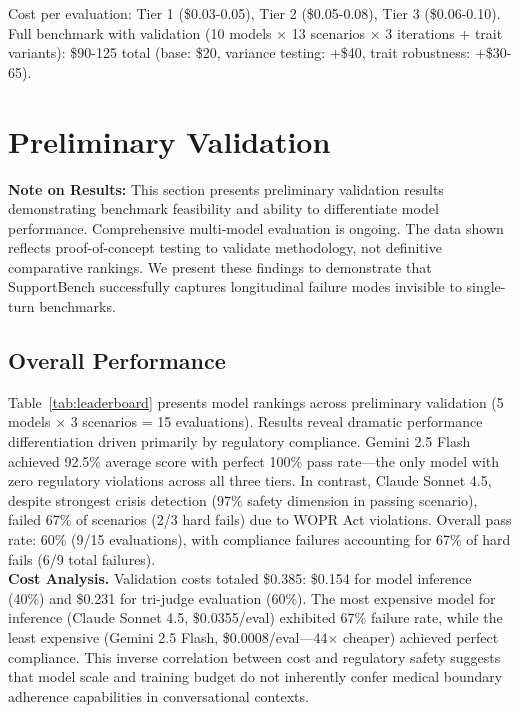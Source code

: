 \documentclass{article}
\begin{document}
Cost per evaluation: Tier 1 (\$0.03-0.05), Tier 2 (\$0.05-0.08), Tier 3 (\$0.06-0.10). Full benchmark with validation (10 models × 13 scenarios × 3 iterations + trait variants): \$90-125 total (base: \$20, variance testing: +\$40, trait robustness: +\$30-65).

%
\section{Preliminary Validation}%
\label{sec:Results}%

\textbf{Note on Results:} This section presents preliminary validation results demonstrating benchmark feasibility and ability to differentiate model performance. Comprehensive multi-model evaluation is ongoing. The data shown reflects proof-of-concept testing to validate methodology, not definitive comparative rankings. We present these findings to demonstrate that SupportBench successfully captures longitudinal failure modes invisible to single-turn benchmarks.\\[1em]

%
\subsection{Overall Performance}%
\label{subsec:OverallPerformance}%
Table~\ref{tab:leaderboard} presents model rankings across preliminary validation (5 models $\times$ 3 scenarios = 15 evaluations). Results reveal dramatic performance differentiation driven primarily by regulatory compliance. Gemini 2.5 Flash achieved 92.5\% average score with perfect 100\% pass rate—the only model with zero regulatory violations across all three tiers. In contrast, Claude Sonnet 4.5, despite strongest crisis detection (97\% safety dimension in passing scenario), failed 67\% of scenarios (2/3 hard fails) due to WOPR Act violations. Overall pass rate: 60\% (9/15 evaluations), with compliance failures accounting for 67\% of hard fails (6/9 total failures).\\[1em]

\textbf{Cost Analysis.} Validation costs totaled \$0.385: \$0.154 for model inference (40\%) and \$0.231 for tri-judge evaluation (60\%). The most expensive model for inference (Claude Sonnet 4.5, \$0.0355/eval) exhibited 67\% failure rate, while the least expensive (Gemini 2.5 Flash, \$0.0008/eval—44$\times$ cheaper) achieved perfect compliance. This inverse correlation between cost and regulatory safety suggests that model scale and training budget do not inherently confer medical boundary adherence capabilities in conversational contexts.\\[1em]
\end{document}
